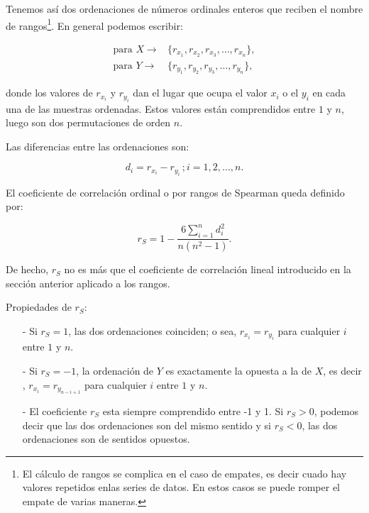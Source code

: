 \documentclass[12pt]{report}
\begin{document}
Tenemos así dos ordenaciones de  números ordinales enteros que reciben el nombre de
rangos\footnote{El cálculo de rangos se complica en el caso de empates, es decir cuado hay valores repetidos enlas series de datos. En estos casos se puede romper el empate de varias maneras.}. En general podemos escribir:

$$
\begin{array}{cc}
\mbox{para } X \rightarrow & \{r_{x_1},r_{x_2}, r_{x_3},\ldots, r_{x_n}\}, \\ 
\mbox{para } Y \rightarrow & \{r_{y_1},r_{y_2}, r_{y_3},\ldots, r_{y_n}\},
\end{array}
$$

donde los valores de $r_{x_i}$ y $r_{y_i}$ dan el lugar que ocupa el valor $x_i$ o el
$y_i$ en cada una de las muestras ordenadas. Estos valores están comprendidos entre $1$ y $n$, luego
son dos permutaciones de orden $n$.

Las diferencias entre las ordenaciones son:

$$d_i=r_{x_i}-r_{y_i}\, ; i=1,2,\ldots,n.$$

El coeficiente de correlación ordinal o por rangos de Spearman queda definido por:

$$
r_S= 1-\frac{6\sum\limits_{i=1}^n d^2_i}{n \left(n^2-1\right)}.
$$

De hecho, $r_S$ no es más que el coeficiente de correlación lineal introducido en la
sección anterior aplicado a los rangos.

Propiedades de $r_S$:

\begin{itemize}
\item[-] Si $r_S  = 1$, las dos ordenaciones coinciden; o sea,
$r_{x_i}=r_{y_i}$ para cualquier $i$ entre $1$ y $n$.

\item[-] Si $r_S  = -1$, la ordenación de  $Y$ es exactamente la opuesta a la de $X$, es decir
,  $r_{x_i}=r_{y_{n-i+1}}$  para cualquier $i$ entre $1$ y $n$.

\item[-]  El coeficiente $r_S$ esta siempre comprendido  entre -1
y 1. Si $r_S  >0$, podemos decir   que las dos ordenaciones son del mismo sentido
 y si $r_S <0$, las dos ordenaciones son de sentidos opuestos.
\end{itemize}
\end{document}
